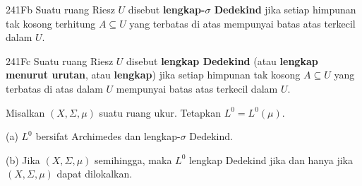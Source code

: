\spheader 241Fb Suatu ruang Riesz $U$ disebut {\bf lengkap-$\sigma$
Dedekind} jika setiap himpunan tak kosong terhitung
$A\subseteq U$ yang terbatas di atas mempunyai batas atas terkecil dalam
$U$.

\spheader 241Fc Suatu ruang Riesz $U$ disebut {\bf lengkap Dedekind}
(atau {\bf lengkap menurut urutan}, atau {\bf lengkap}) jika setiap
himpunan tak kosong $A\subseteq U$ yang terbatas di atas dalam $U$
mempunyai batas atas terkecil dalam $U$.

 Misalkan $(X,\Sigma,\mu)$ suatu ruang ukur.
Tetapkan $L^0=L^0(\mu)$.

(a) $L^0$ bersifat Archimedes dan lengkap-$\sigma$ Dedekind.

(b) Jika $(X,\Sigma,\mu)$ semihingga, maka $L^0$ lengkap Dedekind jika dan hanya jika
$(X,\Sigma,\mu)$ dapat dilokalkan.


